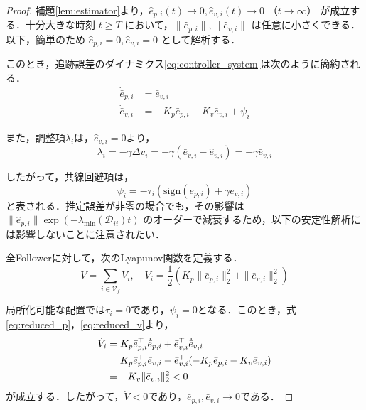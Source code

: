 \documentclass[a4paper]{jarticle}
\theoremstyle{definition}
\theoremstyle{remark}
\numberwithin{equation}{section}
\begin{document}
	\begin{proof}
		補題\ref{lem:estimator}より，$\hat{e}_{p,i}(t) \to 0, \hat{e}_{v,i}(t) \to 0$ （$t \to \infty$） が成立する．十分大きな時刻 $t \ge T$ において，$\|\hat{e}_{p,i}\|, \|\hat{e}_{v,i}\|$ は任意に小さくできる．以下，簡単のため $\hat{e}_{p,i} = 0, \hat{e}_{v,i} = 0$ として解析する．
		
		このとき，追跡誤差のダイナミクス\eqref{eq:controller_system}は次のように簡約される．
		\begin{align}
			\dot{\bar{e}}_{p,i} &= \bar{e}_{v,i} \label{eq:reduced_p}\\
			\dot{\bar{e}}_{v,i} &= -K_p \bar{e}_{p,i} - K_v \bar{e}_{v,i} + \psi_i \label{eq:reduced_v}
		\end{align}
		
		また，調整項$\lambda_i$は，$\hat{e}_{v,i} = 0$より，
		\begin{equation}
			\lambda_i = -\gamma \Delta v_i = -\gamma (\bar{e}_{v,i} - \hat{e}_{v,i}) = -\gamma \bar{e}_{v,i}
			\label{eq:lambda_reduced}
		\end{equation}
		
		したがって，共線回避項は，
		\begin{equation}
			\psi_i = -\tau_i(\mathrm{sign}(\bar{e}_{p,i}) + \gamma \bar{e}_{v,i})
			\label{eq:psi_reduced}
		\end{equation}
		と表される．推定誤差が非零の場合でも，その影響は $\|\hat{e}_{p,i}\| \exp(-\lambda_{\min}(\mathcal{D}_{ii}) t)$ のオーダーで減衰するため，以下の安定性解析には影響しないことに注意されたい．
		
		全Followerに対して，次のLyapunov関数を定義する．
		\begin{equation}
			V = \sum_{i \in \mathcal{V}_f} V_i, \quad V_i = \frac{1}{2}\left( K_p \|\bar{e}_{p,i}\|_2^2 + \|\bar{e}_{v,i}\|_2^2 \right)
			\label{eq:lyapunov}
		\end{equation}
		
		局所化可能な配置では$\tau_i = 0$であり，$\psi_i = 0$となる．このとき，式\eqref{eq:reduced_p}，\eqref{eq:reduced_v}より，
		\begin{align}
			\dot{V}_i &= K_p \bar{e}_{p,i}^\top \dot{\bar{e}}_{p,i} + \bar{e}_{v,i}^\top \dot{\bar{e}}_{v,i} \notag\\
			&= K_p \bar{e}_{p,i}^\top \bar{e}_{v,i} + \bar{e}_{v,i}^\top (-K_p \bar{e}_{p,i} - K_v \bar{e}_{v,i}) \notag\\
			&= - K_v \|\bar{e}_{v,i}\|_2^2 < 0
			\label{eq:Vdot_localizable}
		\end{align}
		が成立する．したがって，$\dot{V} < 0$であり，$\bar{e}_{p,i}, \bar{e}_{v,i} \to 0$である．
		

\end{proof}
\end{document}
